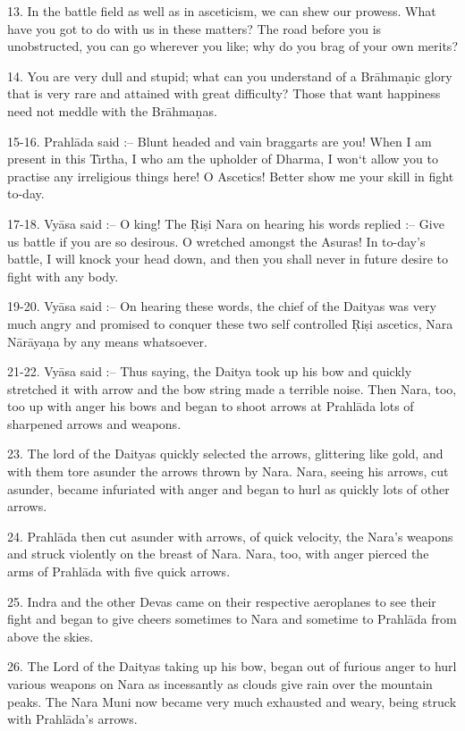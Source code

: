 13. In the battle field as well as in asceticism, we can shew our prowess. What have you got to do with us in these matters? The road before you is unobstructed, you can go wherever you like; why do you brag of your own merits?

14. You are very dull and stupid; what can you understand of a Br\=ahma\d{n}ic glory that is very rare and attained with great difficulty? Those that want happiness need not meddle with the Br\=ahma\d{n}as.

15-16. Prahl\=ada said :-- Blunt headed and vain braggarts are you! When I am present in this T\={\i}rtha, I who am the upholder of Dharma, I won`t allow you to practise any irreligious things here! O Ascetics! Better show me your skill in fight to-day.

17-18. Vy\=asa said :-- O king! The \d{R}i\d{s}i Nara on hearing his words replied :-- Give us battle if you are so desirous. O wretched amongst the Asuras! In to-day's battle, I will knock your head down, and then you shall never in future desire to fight with any body.

19-20. Vy\=asa said :-- On hearing these words, the chief of the Daityas was very much angry and promised to conquer these two self controlled \d{R}i\d{s}i ascetics, Nara N\=ar\=aya\d{n}a by any means whatsoever.

21-22. Vy\=asa said :-- Thus saying, the Daitya took up his bow and quickly stretched it with arrow and the bow string made a terrible noise. Then Nara, too, too up with anger his bows and began to shoot arrows at Prahl\=ada lots of sharpened arrows and weapons.

23. The lord of the Daityas quickly selected the arrows, glittering like gold, and with them tore asunder the arrows thrown by Nara. Nara, seeing his arrows, cut asunder, became infuriated with anger and began to hurl as quickly lots of other arrows.

24. Prahl\=ada then cut asunder with arrows, of quick velocity, the Nara's weapons and struck violently on the breast of Nara. Nara, too, with anger pierced the arms of Prahl\=ada with five quick arrows.

25. Indra and the other Devas came on their respective aeroplanes to see their fight and began to give cheers sometimes to Nara and sometime to Prahl\=ada from above the skies.

26. The Lord of the Daityas taking up his bow, began out of furious anger to hurl various weapons on Nara as incessantly as clouds give rain over the mountain peaks. The Nara Muni now became very much exhausted and weary, being struck with Prahl\=ada's arrows.

